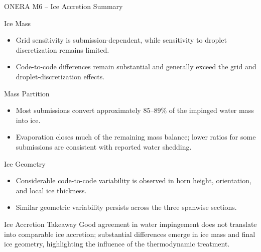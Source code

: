 
\begin{frame}{\small ONERA M6 -- Ice Accretion Summary}
\scriptsize

\begin{block}{\scriptsize Ice Mass}
\begin{itemize}
    \item Grid sensitivity is submission-dependent, while sensitivity to droplet discretization remains limited.
    \item Code-to-code differences remain substantial and generally exceed the grid and droplet-discretization effects.
\end{itemize}
\end{block}

\vspace{0.08cm}

\begin{block}{\scriptsize Mass Partition}
\begin{itemize}
    \item Most submissions convert approximately $85$--$89\%$ of the impinged water mass into ice.
    \item Evaporation closes much of the remaining mass balance; lower ratios for some submissions are consistent with reported water shedding.
\end{itemize}
\end{block}

\vspace{0.08cm}

\begin{block}{\scriptsize Ice Geometry}
\begin{itemize}
    \item Considerable code-to-code variability is observed in horn height, orientation, and local ice thickness.
    \item Similar geometric variability persists across the three spanwise sections.
\end{itemize}
\end{block}

\vspace{0.08cm}

\begin{alertblock}{\scriptsize Ice Accretion Takeaway}
Good agreement in water impingement does not translate into comparable ice accretion; substantial differences emerge in ice mass and final ice geometry, highlighting the influence of the thermodynamic treatment.
\end{alertblock}

\end{frame}

